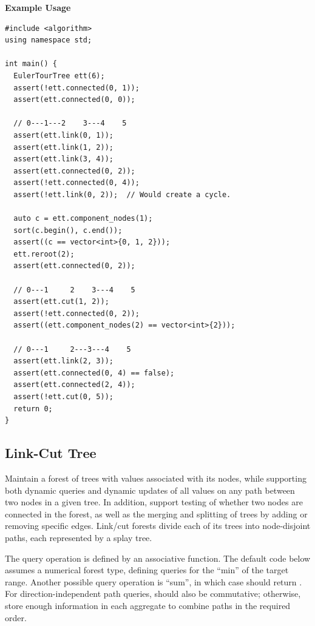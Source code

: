 \textbf{Example Usage}\par
\begin{lstlisting}[style=cpp]
#include <algorithm>
using namespace std;

int main() {
  EulerTourTree ett(6);
  assert(!ett.connected(0, 1));
  assert(ett.connected(0, 0));

  // 0---1---2    3---4    5
  assert(ett.link(0, 1));
  assert(ett.link(1, 2));
  assert(ett.link(3, 4));
  assert(ett.connected(0, 2));
  assert(!ett.connected(0, 4));
  assert(!ett.link(0, 2));  // Would create a cycle.

  auto c = ett.component_nodes(1);
  sort(c.begin(), c.end());
  assert((c == vector<int>{0, 1, 2}));
  ett.reroot(2);
  assert(ett.connected(0, 2));

  // 0---1     2    3---4    5
  assert(ett.cut(1, 2));
  assert(!ett.connected(0, 2));
  assert((ett.component_nodes(2) == vector<int>{2}));

  // 0---1     2---3---4    5
  assert(ett.link(2, 3));
  assert(ett.connected(0, 4) == false);
  assert(ett.connected(2, 4));
  assert(!ett.cut(0, 5));
  return 0;
}
\end{lstlisting}
\subsection{Link-Cut Tree}
\label{sec:2.8.10}
Maintain a forest of trees with values associated with its nodes, while supporting both dynamic queries and dynamic updates of all values on any path between two nodes in a given tree. In addition, support testing of whether two nodes are connected in the forest, as well as the merging and splitting of trees by adding or removing specific edges. Link/cut forests divide each of its trees into node-disjoint paths, each represented by a splay tree.

The query operation is defined by an associative  function. The default code below assumes a numerical forest type, defining queries for the ``min'' of the target range. Another possible query operation is ``sum'', in which case  should return . For direction-independent path queries,  should also be commutative; otherwise, store enough information in each aggregate to combine paths in the required order.

